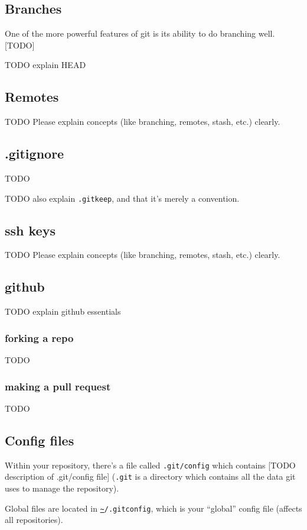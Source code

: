 \documentclass[12pt]{article}
\newcommand{\urlwofont}[1]{\urlstyle{same}\url{#1}}
\begin{document}
\subsection{Branches}
One of the more powerful features of git is its ability to do branching well. [TODO]

TODO explain HEAD

\subsection{Remotes}
TODO
Please explain concepts (like branching, remotes, stash, etc.) clearly.

\subsection{.gitignore}
TODO

TODO also explain \texttt{.gitkeep}, and that it's merely a convention.


\subsection{ssh keys}
TODO
Please explain concepts (like branching, remotes, stash, etc.) clearly.

\subsection{github}
TODO explain github essentials

\subsubsection{forking a repo}
TODO
\subsubsection{making a pull request}
TODO

\subsection{Config files}
Within your repository, there's a file called \texttt{.git/config} which contains [TODO description of .git/config file] (\texttt{.git} is a directory which contains all the data git uses to manage the repository).

Global files are located in \texttt{\urlwofont{~}/.gitconfig}, which is your ``global'' config file (affects all repositories).
\end{document}
